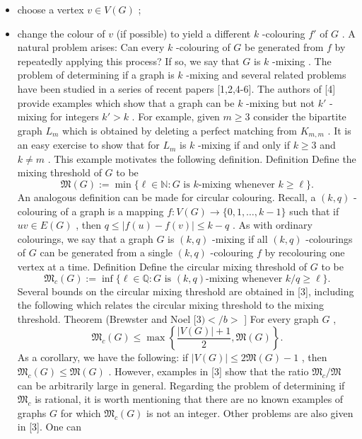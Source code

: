 \documentclass[
  11pt,
  a4paper,
]{article}
\begin{document}
\begin{itemize}
\item
  choose a vertex \(v\in V(G)\) ;
\item
  change the colour of \(v\) (if possible) to yield a different \(k\)
  -colouring \(f'\) of \(G\) . A natural problem arises: Can every \(k\)
  -colouring of \(G\) be generated from \(f\) by repeatedly applying
  this process? If so, we say that \(G\) is \(k\) -mixing . The problem
  of determining if a graph is \(k\) -mixing and several related
  problems have been studied in a series of recent papers {[}1,2,4-6{]}.
  The authors of {[}4{]} provide examples which show that a graph can be
  \(k\) -mixing but not \(k'\) -mixing for integers \(k' > k\) . For
  example, given \(m\geq3\) consider the bipartite graph \(L_m\) which
  is obtained by deleting a perfect matching from \(K_{m,m}\) . It is an
  easy exercise to show that for \(L_m\) is \(k\) -mixing if and only if
  \(k\geq3\) and \(k\neq m\) . This example motivates the following
  definition. Definition Define the mixing threshold of \(G\) to be
  \[\mathfrak{M}(G) := \min\{\ell\in\mathbb{N}: G\text{ is }k\text{-mixing whenever } k\geq\ell\}.\]
  An analogous definition can be made for circular colouring. Recall, a
  \((k,q)\) -colouring of a graph is a mapping
  \(f:V(G)\to \{0,1,\dots,k-1\}\) such that if \(uv\in E(G)\) , then
  \(q\leq |f(u)-f(v)|\leq k-q\) . As with ordinary colourings, we say
  that a graph \(G\) is \((k,q)\) -mixing if all \((k,q)\) -colourings
  of \(G\) can be generated from a single \((k,q)\) -colouring \(f\) by
  recolouring one vertex at a time. Definition Define the circular
  mixing threshold of \(G\) to be
  \[\mathfrak{M}_c(G) := \inf\{\ell\in\mathbb{Q}: G\text{ is }(k,q)\text{-mixing whenever } k/q \geq\ell\}.\]
  Several bounds on the circular mixing threshold are obtained in
  {[}3{]}, including the following which relates the circular mixing
  threshold to the mixing threshold. Theorem (Brewster and Noel
  \([3)</b>\) {]} For every graph \(G\) ,
  \[\mathfrak{M}_c(G)\leq\max\left\{\frac{|V(G)|+1}{2}, \mathfrak{M}(G)\right\}.\]
  As a corollary, we have the following: if
  \(|V(G)|\leq 2\mathfrak{M}(G)-1\) , then
  \(\mathfrak{M}_c(G)\leq \mathfrak{M}(G)\) . However, examples in
  {[}3{]} show that the ratio \(\mathfrak{M}_c/\mathfrak{M}\) can be
  arbitrarily large in general. Regarding the problem of determining if
  \(\mathfrak{M}_c\) is rational, it is worth mentioning that there are
  no known examples of graphs \(G\) for which \(\mathfrak{M}_c(G)\) is
  not an integer. Other problems are also given in {[}3{]}. One can

\end{itemize}
\end{document}
